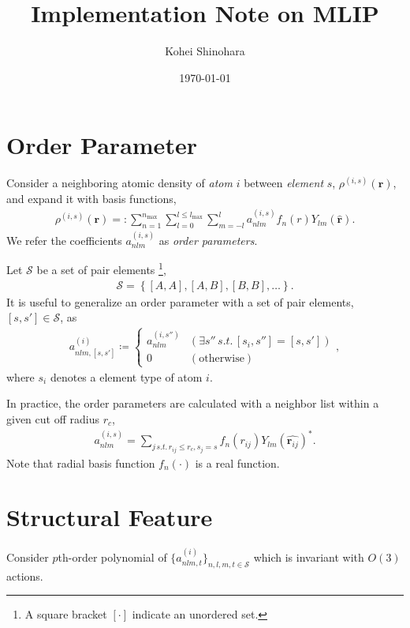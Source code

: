 \documentclass[a4paper, 11pt]{article}
\title{Implementation Note on MLIP}
\author{Kohei Shinohara}
\date{\today}
\theoremstyle{definition}
\newcommand{\term}[1]{\textit{#1}}
\begin{document}
\maketitle

\section{Order Parameter}
Consider a neighboring atomic density of \term{atom} $i$ between \term{element} $s$, $\rho^{(i, s)}(\mathbf{r})$, and expand it with basis functions,
\begin{align}
  \rho^{(i, s)}(\mathbf{r})
    =: \sum_{n=1}^{n_{\mathrm{max}}} \sum_{l=0}^{l \leq l_{\mathrm{max}}} \sum_{m=-l}^{l} a^{(i, s)}_{nlm} f_{n}(r) Y_{lm}(\hat{\mathbf{r}}).
\end{align}
We refer the coefficients $a^{(i, s)}_{nlm}$ as \term{order parameters}.

Let $\mathcal{S}$ be a set of pair elements
\footnote{
  A square bracket $[ \cdot ]$ indicate an unordered set.
},
\begin{align}
  \mathcal{S} = \left\{ [A, A], [A, B], [B, B], \dots \right\}.
\end{align}
It is useful to generalize an order parameter with a set of pair elements, $[s, s'] \in \mathcal{S}$, as
\begin{align}
  a^{(i)}_{nlm, [s, s'] } \coloneqq
  \begin{cases}
    a^{(i, s'')}_{nlm} & (\exists s'' \,s.t.\, [s_{i}, s''] = [s, s'] ) \\
    0 & (\mathrm{otherwise})
  \end{cases},
\end{align}
where $s_{i}$ denotes a element type of atom $i$.

In practice, the order parameters are calculated with a neighbor list within a given cut off radius $r_{c}$,
\begin{align}
  a^{(i, s)}_{nlm} = \sum_{j \,s.t.\, r_{ij} \leq r_{c}, s_{j} = s} f_{n}(r_{ij}) Y_{lm}(\hat{\mathbf{r}_{ij}})^{\ast}.
\end{align}
Note that radial basis function $f_{n}(\cdot)$ is a real function.

\section{Structural Feature}
Consider $p$th-order polynomial of $\{ a^{(i)}_{nlm, t}\}_{n, l, m, t \in \mathcal{S}}$ which is invariant with $O(3)$ actions.
\end{document}
